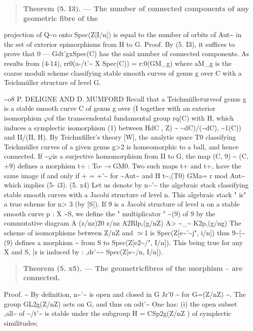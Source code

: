 \documentclass[11pt]{article}
\theoremstyle{plain}
\theoremstyle{definition}
\theoremstyle{remark}
\begin{document}
\begin{quote}\textbf{Theorem (5. I3). --- The number of connected components of any geometric fibre of the}\end{quote}
projection of Q\textasciitilde{}o onto Spec(Z[I/n]) is equal to the number of orbits of Aut\textasciitilde{} in the set of exterior epimorphisms from H to G. Proof. By (5. I3), it suffices to prove that 0 --- Gdt'gxSpec(C) has the said number of connected components. As results from (4-14), rr0(a-/t'\textasciitilde{} X Spec(C)) = r:0(GM\_g) where aM\_g is the coarse moduli scheme classifying stable smooth curves of genus g over C with a Teichm\"uller structure of level G.

\textasciitilde{}o8 P. DELIGNE AND D. MUMFORD Recall that a Teichm\"ulle$\pi$urveof genus g is a stable smooth curve C of genus g over (I together with an exterior isomorphism $\varphi$of the transcendental fundamental group rq(C) with H, which induces a symplectic isomorphism (1) between HdC , Z) \textasciitilde{} \textasciitilde{}dC)/(\textasciitilde{}dC), \textasciitilde{}1(C)) and II/(II, H). By Teichmfiller's theory [W], the analytic space T0 classifying Teichm\"uller curves of a given genus g>2 is homeomorphic to a ball, and hence connected. If \textasciitilde{}$\varphi$is a surjective homomorphism from II to G, the map (C, 9) \textasciitilde{} (C, +9) defines a morphism t+ : To-$\to$GM0. Two such maps t+ and t+, have the same image if and only if + = +'\textasciitilde{} for \textasciitilde{}Aut\textasciitilde{} and H t\textasciitilde{},(T0) GMa= r mod Aut\textasciitilde{} which implies (5- i3). (5. x4) Let us denote by n\textasciitilde{}'\textasciitilde{} the algebraic stack classifying stable smooth curves with a Jacobi structure of level n. This algebraic stack " is" a true scheme for n> 3 (by [S]). If 9 is a Jacobi structure of level n on a stable smooth curve p : X \textasciitilde{}S, we define the " multiplicator " \textasciitilde{}(9) of 9 by the commutative diagram A (z/nz)20 z/nz A2Rlp,(g/nZ) A> \textasciitilde{}\_\textasciitilde{} K2p,(g/ng) The scheme of isomorphisms between Z/nZ and $\simeq$1 is Spec(Z[e\textasciitilde{}'\textasciitilde{}j", i/n]) thus 9\textasciitilde{}[\textasciitilde{}(9) defines a morphism \textasciitilde{} from S to Spec(Z[e2\textasciitilde{}/", I/n]). This being true for any X and S, [z is induced by : ,dr'\textasciitilde{}\textasciitilde{} Spec(Z[e\textasciitilde{}/n, I/n]).

\begin{quote}\textbf{Theorem (5. x5). --- The geometricfibres of the morphism \textasciitilde{} are connected.}\end{quote}
Proof. \textasciitilde{} By definition, n\textasciitilde{}'\textasciitilde{} is open and closed in G Jr'0 \textasciitilde{} for G=(Z/nZ) \textasciitilde{}. The group GL2g(Z/nZ) acts on G, and thus on odt'\textasciitilde{} One has: (i) the open subset ,all\textasciitilde{} of \textasciitilde{}/t'\textasciitilde{} is stable under the subgroup H = CSp2g(Z/nZ ) of symplectic similitudes;
\end{document}
